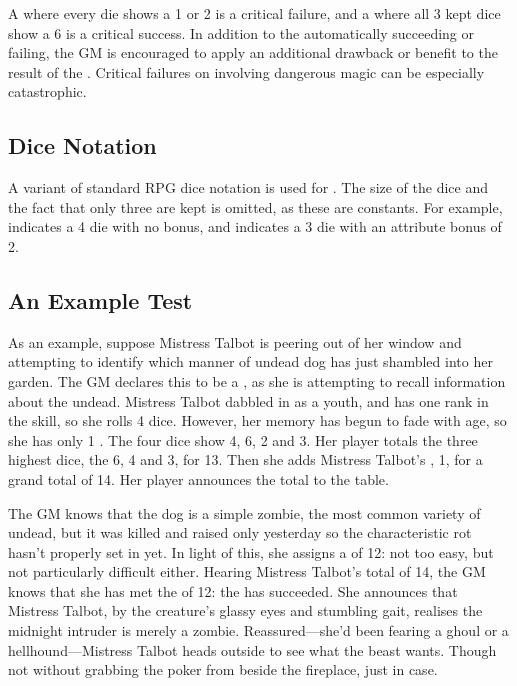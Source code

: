 A {\test} where every die shows a 1 or 2 is a critical failure, and a {\test} where all 3 kept dice show a 6 is a critical success.
In addition to the {\test} automatically succeeding or failing, the GM is encouraged to apply an additional drawback or benefit to the result of the {\test}.
Critical failures on {\tests} involving dangerous magic can be especially catastrophic.

\subsection{Dice Notation}

A variant of standard RPG dice notation is used for {\tests}.
The size of the dice and the fact that only three are kept is omitted, as these are constants.
For example,  indicates a 4 die {\test} with no bonus, and  indicates a 3 die {\test} with an attribute bonus of 2.

\subsection{An Example Test}

As an example, suppose Mistress Talbot is peering out of her window and attempting to identify which manner of undead dog has just shambled into her garden.
The GM declares this to be a  {\test}, as she is attempting to recall information about the undead.
Mistress Talbot dabbled in  as a youth, and has one rank in the skill, so she rolls 4 dice.
However, her memory has begun to fade with age, so she has only 1 .
The four dice show 4, 6, 2 and 3.
Her player totals the three highest dice, the 6, 4 and 3, for 13.
Then she adds Mistress Talbot's , 1, for a grand total of 14.
Her player announces the total to the table.

The GM knows that the dog is a simple zombie, the most common variety of undead, but it was killed and raised only yesterday so the characteristic rot hasn't properly set in yet.
In light of this, she assigns a {\targetnumber} of 12: not too easy, but not particularly difficult either.
Hearing Mistress Talbot's total of 14, the GM knows that she has met the {\tn} of 12: the {\test} has succeeded.
She announces that Mistress Talbot, by the creature's glassy eyes and stumbling gait, realises the midnight intruder is merely a zombie.
Reassured---she'd been fearing a ghoul or a hellhound---Mistress Talbot heads outside to see what the beast wants.
Though not without grabbing the poker from beside the fireplace, just in case.

